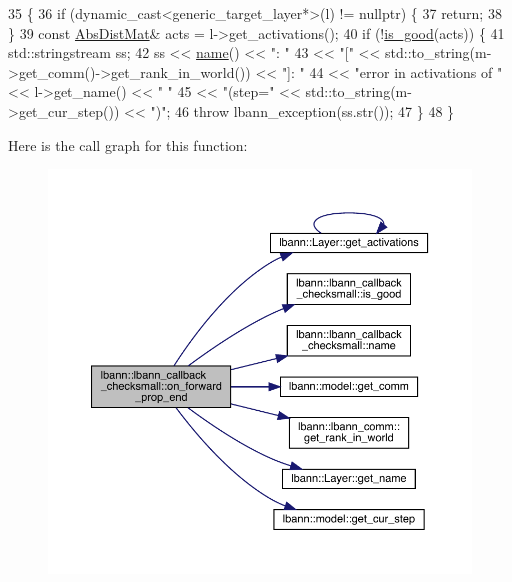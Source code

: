 \begin{DoxyCode}
35                                                                       \{
36   \textcolor{keywordflow}{if} (dynamic\_cast<generic\_target\_layer*>(l) != \textcolor{keyword}{nullptr}) \{
37     \textcolor{keywordflow}{return};
38   \}
39   \textcolor{keyword}{const} \hyperlink{base_8hpp_a9a697a504ae84010e7439ffec862b470}{AbsDistMat}& acts = l->get\_activations();
40   \textcolor{keywordflow}{if} (!\hyperlink{classlbann_1_1lbann__callback__checksmall_afe78f539ba3b2ad3e6ae8c468850052c}{is\_good}(acts)) \{
41     std::stringstream ss;
42     ss << \hyperlink{classlbann_1_1lbann__callback__checksmall_acbdd897ecbe5a27b59db15ae7662e0f9}{name}() << \textcolor{stringliteral}{": "}
43        << \textcolor{stringliteral}{"["} << std::to\_string(m->get\_comm()->get\_rank\_in\_world()) << \textcolor{stringliteral}{"]: "}
44        << \textcolor{stringliteral}{"error in activations of "} << l->get\_name() << \textcolor{stringliteral}{" "}
45        << \textcolor{stringliteral}{"(step="} << std::to\_string(m->get\_cur\_step()) << \textcolor{stringliteral}{")"};
46     \textcolor{keywordflow}{throw} lbann\_exception(ss.str());
47   \}
48 \}
\end{DoxyCode}
Here is the call graph for this function\+:\nopagebreak
\begin{figure}[H]
\begin{center}
\leavevmode
\includegraphics[width=350pt]{classlbann_1_1lbann__callback__checksmall_a2f50695feb1444145bae251f2e94b721_cgraph}
\end{center}
\end{figure}
